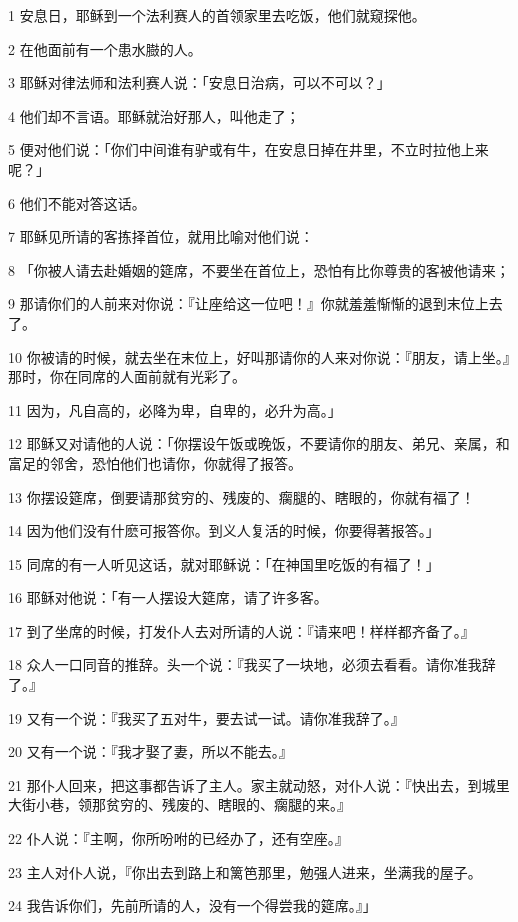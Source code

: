 \par 1 安息日，耶稣到一个法利赛人的首领家里去吃饭，他们就窥探他。
\par 2 在他面前有一个患水臌的人。
\par 3 耶稣对律法师和法利赛人说：「安息日治病，可以不可以？」
\par 4 他们却不言语。耶稣就治好那人，叫他走了；
\par 5 便对他们说：「你们中间谁有驴或有牛，在安息日掉在井里，不立时拉他上来呢？」
\par 6 他们不能对答这话。
\par 7 耶稣见所请的客拣择首位，就用比喻对他们说：
\par 8 「你被人请去赴婚姻的筵席，不要坐在首位上，恐怕有比你尊贵的客被他请来；
\par 9 那请你们的人前来对你说：『让座给这一位吧！』你就羞羞惭惭的退到末位上去了。
\par 10 你被请的时候，就去坐在末位上，好叫那请你的人来对你说：『朋友，请上坐。』那时，你在同席的人面前就有光彩了。
\par 11 因为，凡自高的，必降为卑，自卑的，必升为高。」
\par 12 耶稣又对请他的人说：「你摆设午饭或晚饭，不要请你的朋友、弟兄、亲属，和富足的邻舍，恐怕他们也请你，你就得了报答。
\par 13 你摆设筵席，倒要请那贫穷的、残废的、瘸腿的、瞎眼的，你就有福了！
\par 14 因为他们没有什麽可报答你。到义人复活的时候，你要得著报答。」
\par 15 同席的有一人听见这话，就对耶稣说：「在神国里吃饭的有福了！」
\par 16 耶稣对他说：「有一人摆设大筵席，请了许多客。
\par 17 到了坐席的时候，打发仆人去对所请的人说：『请来吧！样样都齐备了。』
\par 18 众人一口同音的推辞。头一个说：『我买了一块地，必须去看看。请你准我辞了。』
\par 19 又有一个说：『我买了五对牛，要去试一试。请你准我辞了。』
\par 20 又有一个说：『我才娶了妻，所以不能去。』
\par 21 那仆人回来，把这事都告诉了主人。家主就动怒，对仆人说：『快出去，到城里大街小巷，领那贫穷的、残废的、瞎眼的、瘸腿的来。』
\par 22 仆人说：『主啊，你所吩咐的已经办了，还有空座。』
\par 23 主人对仆人说，『你出去到路上和篱笆那里，勉强人进来，坐满我的屋子。
\par 24 我告诉你们，先前所请的人，没有一个得尝我的筵席。』」
